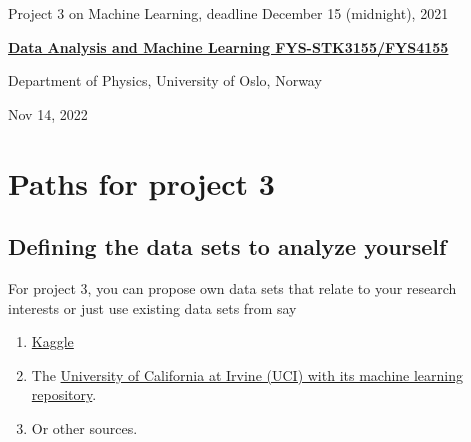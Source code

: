 \documentclass[%
oneside,                 %
final,                   %
10pt]{article}
\begin{document}

\newcommand{\exercisesection}[1]{\subsection*{#1}}






\thispagestyle{empty}

\begin{center}
{\LARGE\bf
\begin{spacing}{1.25}
Project 3 on Machine Learning, deadline December 15 (midnight), 2021
\end{spacing}
}
\end{center}


\begin{center}
{\bf \href{{http://www.uio.no/studier/emner/matnat/fys/FYS3155/index-eng.html}}{Data Analysis and Machine Learning FYS-STK3155/FYS4155}}
\end{center}

    \begin{center}
\centerline{{\small Department of Physics, University of Oslo, Norway}}
\end{center}
    

\begin{center}
Nov 14, 2022
\end{center}

\vspace{1cm}


\section*{Paths for project 3}

\subsection*{Defining the data sets to analyze yourself}

For project 3, you can propose own data sets that relate to your research interests or just use existing data sets from say
\begin{enumerate}
\item \href{{https://www.kaggle.com/datasets}}{Kaggle} 

\item The \href{{https://archive.ics.uci.edu/ml/index.php}}{University of California at Irvine (UCI) with its  machine learning repository}.

\item Or other sources.
\end{enumerate}
\end{document}
